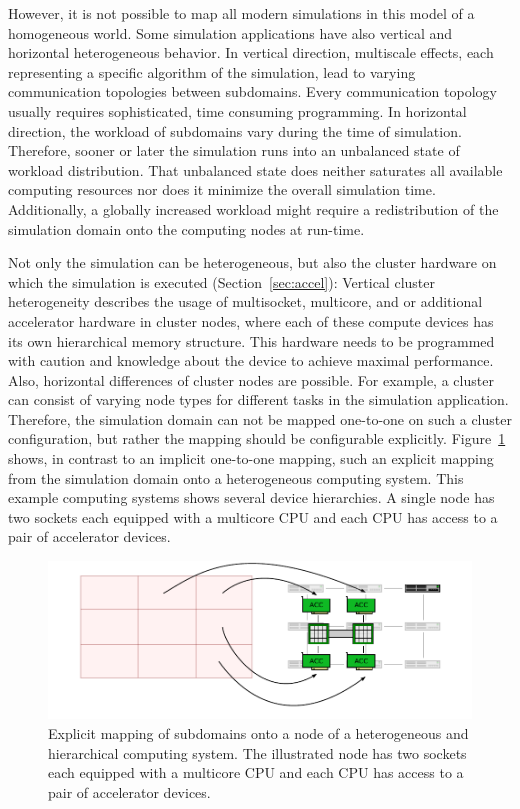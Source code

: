 However, it is not possible to map all modern simulations in this
model of a homogeneous world. Some simulation applications have also
vertical and horizontal heterogeneous behavior.  In vertical
direction, multiscale effects, each representing a specific algorithm
of the simulation, lead to varying communication topologies between
subdomains. Every communication topology usually requires
sophisticated, time consuming programming. In
horizontal direction, the workload of subdomains vary during the
time of simulation. Therefore, sooner or later the simulation runs
into an unbalanced state of workload distribution. That unbalanced
state does neither saturates all available computing resources nor does it
minimize the overall simulation time. Additionally, a globally
increased workload might require a redistribution of the simulation
domain onto the computing nodes at run-time.

Not only the simulation can be heterogeneous, but also the cluster
hardware on which the simulation is executed
(Section~\ref{sec:accel}): Vertical cluster heterogeneity describes
the usage of multisocket, multicore, and or additional accelerator
hardware in cluster nodes, where each of these compute devices has its
own hierarchical memory structure. This hardware needs to be
programmed with caution and knowledge about the device to achieve
maximal performance.  Also, horizontal differences of cluster nodes
are possible. For example, a cluster can consist of varying node types
for different tasks in the simulation application. Therefore, the
simulation domain can not be mapped one-to-one on such a cluster
configuration, but rather the mapping should be configurable
explicitly. Figure~\ref{fig:heterogeneous_cluster_node} shows, in
contrast to an implicit one-to-one mapping, such an explicit mapping from the
simulation domain onto a heterogeneous computing system. This example
computing systems shows several device hierarchies. A single node has
two sockets each equipped with a multicore CPU and each CPU has access
to a pair of accelerator devices.

\begin{figure}[H]
  \centering
  \includegraphics[width=\textwidth]{graphics/30_heterogeneous_cluster_node}
  \caption{Explicit mapping of subdomains onto a node of a
    heterogeneous and hierarchical computing system. The illustrated
    node has two sockets each equipped with a multicore CPU and each
    CPU has access to a pair of accelerator devices.}
  \label{fig:heterogeneous_cluster_node}
\end{figure}

